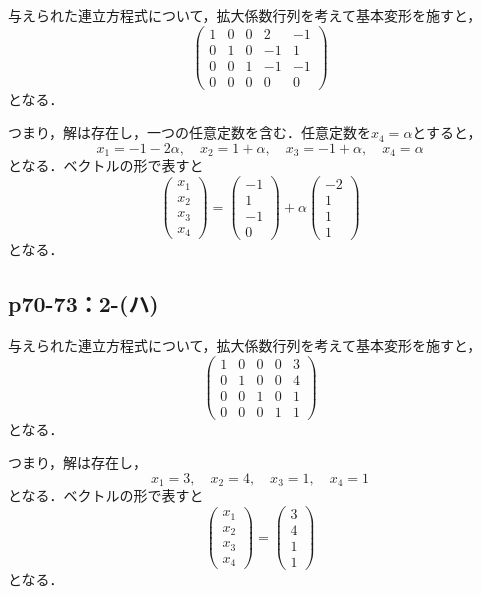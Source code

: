 \documentclass[a4paper,10pt,fleqn]{ltjsarticle}
\begin{document}
\begin{tleftbar}
    与えられた連立方程式について，拡大係数行列を考えて基本変形を施すと，
    \[
        \begin{pmatrix} 1 & 0 & 0  & 2 & -1 \\ 0 & 1& 0  & -1 & 1 \\ 0 & 0 & 1 & -1 & -1 \\ 0 & 0 & 0 & 0 & 0 \end{pmatrix}
    \]
    となる．

    つまり，解は存在し，一つの任意定数を含む．任意定数を$x_4 = \alpha$とすると，
    \[
        x_1 = -1 -2\alpha   , \quad x_2 =1+\alpha  , \quad x_3 =-1+ \alpha  , \quad x_4 = \alpha
    \]
    となる．ベクトルの形で表すと
    \[
        \begin{pmatrix} x_1 \\ x_2 \\ x_3 \\ x_4  \end{pmatrix}= \begin{pmatrix} -1 \\ 1 \\ -1 \\ 0 \end{pmatrix} +\alpha \begin{pmatrix} -2 \\ 1\\ 1 \\ 1\end{pmatrix}
    \]
    となる．
\end{tleftbar}

\newpage

\subsection*{p70-73：2-(ハ)}

\begin{tleftbar}
    与えられた連立方程式について，拡大係数行列を考えて基本変形を施すと，
    \[
        \begin{pmatrix} 1 & 0 & 0  & 0 & 3 \\ 0 & 1& 0  & 0 & 4 \\ 0 & 0 & 1 & 0 & 1 \\ 0 & 0 & 0 & 1 & 1 \end{pmatrix}
    \]
    となる．

    つまり，解は存在し，
    \[
        x_1 = 3 , \quad x_2 =4 , \quad x_3 = 1 , \quad x_4 = 1
    \]
    となる．ベクトルの形で表すと
    \[
        \begin{pmatrix} x_1 \\ x_2 \\ x_3 \\ x_4 \end{pmatrix}= \begin{pmatrix} 3 \\ 4 \\ 1 \\ 1 \end{pmatrix}
    \]
    となる．
\end{tleftbar}
\end{document}
